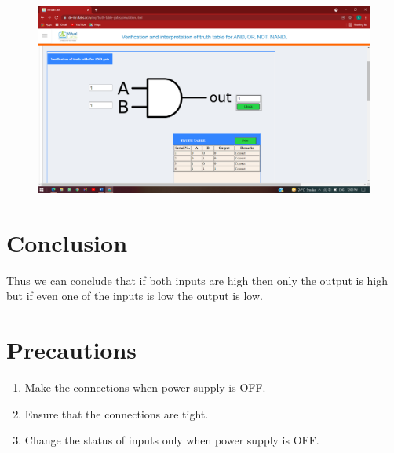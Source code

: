 		\begin{figure}[h]
		\centering
		\includegraphics[width=0.9\linewidth]{img/exp1/7}
		\caption{}
		\label{fig:1:7}
	\end{figure}

\section{Conclusion}
Thus we can conclude that if both inputs are high then only the output is high but if even one of the inputs is low the output is low.

\section{Precautions}
	\begin{enumerate}
		\tightlist
		\item Make the connections when power supply is OFF.
		\item Ensure that the connections are tight.
		\item Change the status of inputs only when power supply is OFF.
	\end{enumerate}